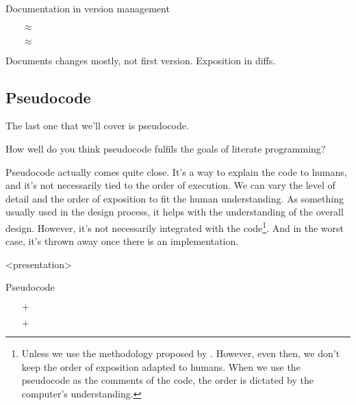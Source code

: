 \begin{frame}
\begin{block}{Documentation in version management}
  \begin{itemize}
    \item[\(\approx\)] {\color{orange}\LPexplain}
    \item[\(\approx\)] {\color{orange}\LPorder}
  \end{itemize}
\end{block}

\begin{remark}
  Documents changes mostly, not first version.
  Exposition in diffs.
\end{remark}
\end{frame}

\subsection{Pseudocode}

The last one that we'll cover is pseudocode.

\begin{frame}
\begin{activity}
How well do you think pseudocode fulfils the goals of literate programming?
\end{activity}
\end{frame}

Pseudocode actually comes quite close.
It's a way to explain the code to humans, and it's not necessarily tied to the 
order of execution.
We can vary the level of detail and the order of exposition to fit the human 
understanding.
As something usually used in the design process, it helps with the 
understanding of the overall design.
However, it's not necessarily integrated with the code\footnote{%
  Unless we use the methodology proposed by \textcite[Ch.~9]{CodeComplete}.
  However, even then, we don't keep the order of exposition adapted to humans.
  When we use the pseudocode as the comments of the code, the order is dictated 
  by the computer's understanding.
}.
And in the worst case, it's thrown away once there is an implementation.

\begin{frame}<presentation>
\begin{block}{Pseudocode}
  \begin{itemize}
    \item[\(+\)] {\color{green!75!black}\LPexplain}
    \item[\(+\)] {\color{green!75!black}\LPorder}
  \end{itemize}
\end{block}
\end{frame}

